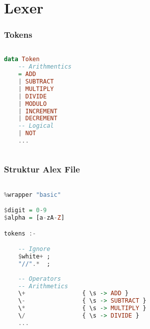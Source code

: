 \section{Lexer}

\begin{frame}[fragile]
	\frametitle{Tokens}
	\begin{lstlisting}[language=Haskell]
		
data Token
	-- Arithmentics
	= ADD
	| SUBTRACT
	| MULTIPLY
	| DIVIDE
	| MODULO
	| INCREMENT
	| DECREMENT
	-- Logical
	| NOT	
	...	
		
	\end{lstlisting}
\end{frame}

\begin{frame}[fragile]
	\frametitle{Struktur Alex File}
	\begin{lstlisting}[basicstyle=\tiny, language=Haskell]

%wrapper "basic"

$digit = 0-9
$alpha = [a-zA-Z]

tokens :-

	-- Ignore
	$white+ ; 
	"//".*  ;
	
	-- Operators
	-- Arithmetics
	\+                { \s -> ADD }
	\-                { \s -> SUBTRACT }
	\*                { \s -> MULTIPLY }
	\/                { \s -> DIVIDE }	
	...

	\end{lstlisting}
\end{frame}